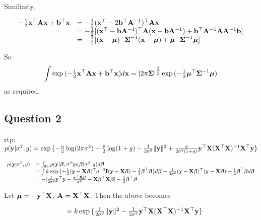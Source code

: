 \documentclass{amsart}[12pt]
\begin{document}
Similiarly,

\begin{equation*}
\begin{array}{ll}
-\tfrac{1}{2} {\bf x}^\top {\bf A} {\bf x} + {\bf b}^\top {\bf x} &= -\tfrac{1}{2}({\bf x}^\top -2{\bf b}^\top {\bf A}^{-1})^\top {\bf A} {\bf x} \\
&= -\tfrac{1}{2} [({\bf x}^\top - {\bf b} {\bf A}^{-1})^\top {\bf A} ({\bf x} - {\bf b} {\bf A}^{-1}) + {\bf b}^\top {\bf A}^{-1} {\bf A} {\bf A}^{-1} {\bf b}] \\
&= -\tfrac{1}{2} [({\bf x} - {\boldsymbol \mu})^\top {\boldsymbol\Sigma}^{-1} ({\bf x} - {\boldsymbol \mu}) + {\boldsymbol \mu}^\top {\boldsymbol\Sigma}^{-1} {\boldsymbol \mu}]
\end{array}
\end{equation*}

So
\begin{equation*}
\int \exp{(- \tfrac{1}{2} {\bf x}^\top {\bf A}{\bf x}+ {\bf b}^\top {\bf x})} d{\bf x} = |2 \pi {\boldsymbol\Sigma}|^{\tfrac{1}{2}} \exp{(- \tfrac{1}{2} {\boldsymbol\mu}^\top {\boldsymbol\Sigma}^{-1} {\boldsymbol\mu})}
\end{equation*}
as required.
\subsection{Question 2}

rtp: $p({\bf y} | \sigma^2, g) = \exp{\{ - \frac{n}{2} \log (2 \pi \sigma^2) - \frac{p}{2} \log(1 + g) - \frac{1}{2 \sigma^2} \| {\bf y}\|^2  + \frac{g}{2 \sigma^2 (1 + g)} {\bf y}^\top {\bf X}({\bf X}^\top {\bf X})^{-1} {\bf X}^\top {\bf y}\}}$

\begin{equation*}
\begin{array}{ll}
p({\bf y} | \sigma^2, g) &= \int_{{\mathbb R}^p} p({\bf y} | {\boldsymbol \beta}, \sigma^2) p({\boldsymbol \beta} | \sigma^2, g) d {\boldsymbol \beta} \\
&= \int k \exp{\{ - \tfrac{1}{2} ({\bf y}- {\bf X}{\boldsymbol\beta})^\top \sigma^{-2} {\bf I}({\bf y}- {\bf X}{\boldsymbol\beta}) -  \tfrac{1}{2} {\boldsymbol\beta}^\top {\boldsymbol\beta}\}} d {\boldsymbol \beta} - \frac{1}{2 \sigma^2} ({\bf y} - {\bf X} {\boldsymbol \beta})^\top ({\bf y} - {\bf X} {\boldsymbol \beta}) -\tfrac{1}{2} {\boldsymbol \beta}^\top {\boldsymbol\beta} d {\boldsymbol \beta} \\
&= -[\frac{1}{2 \sigma^2} {\bf y}^\top {\bf y} - \frac{{\bf y}^\top {\bf X} {\boldsymbol\beta}}{\sigma^2} + {\bf X} {\boldsymbol \beta}^\top {\bf X} {\boldsymbol\beta}] - \tfrac{1}{2} {\boldsymbol \beta}^\top {\boldsymbol\beta}
\end{array}
\end{equation*}

Let ${\boldsymbol \mu} = -{\bf y}^\top {\bf X}$, ${\bf A} = {\bf X}^\top {\bf X}$. Then the above becomes

\begin{equation*}
\begin{array}{ll}
&= k \exp{ \{ \frac{1}{2 \sigma^2} \| {\bf y}\|^2 - \frac{1}{2 \sigma^2} {\bf y}^\top {\bf X}({\bf X}^\top {\bf X})^{-1} {\bf X}^\top {\bf y}\} }
\end{array}
\end{equation*}
\end{document}
